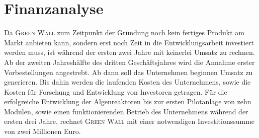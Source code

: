 \chapter{Finanzanalyse}

    Da \textsc{Green Wall} zum Zeitpunkt der Gründung noch kein fertiges Produkt am Markt anbieten kann, sondern erst noch Zeit in die Entwicklungsarbeit investiert werden muss, ist während der ersten zwei Jahre mit keinerlei Umsatz zu rechnen.
    Ab der zweiten Jahreshälfte des dritten Geschäftsjahres wird die Annahme erster Vorbestellungen angestrebt.
    Ab dann soll das Unternehmen beginnen Umsatz zu generieren.
    Bis dahin werden die laufenden Kosten des Unternehmens, sowie die Kosten für Forschung und Entwicklung von Investoren getragen.
    Für die erfolgreiche Entwicklung der Algenreaktoren bis zur ersten Pilotanlage von zehn Modulen, sowie einen funktionierenden Betrieb des Unternehmens während der ersten drei Jahre, rechnet \textsc{Green Wall} mit einer notwendigen Investitionssumme von zwei Millionen Euro.

